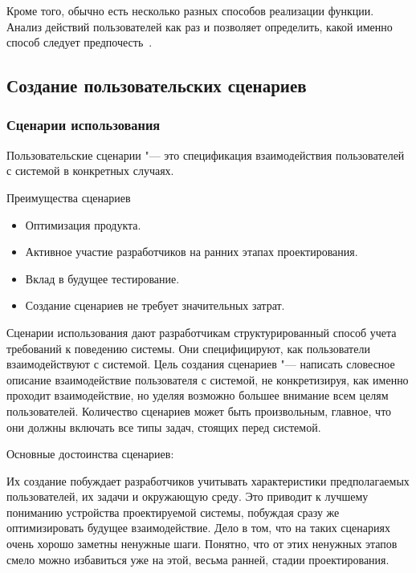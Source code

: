 \documentclass{../industrial-development}
\begin{document}
Кроме того, обычно есть несколько разных способов реализации функции. Анализ действий пользователей как раз и позволяет определить, какой именно способ следует предпочесть~\cite[с.~113--114]{Golovach}.

\subsection{Создание пользовательских сценариев}

\begin{frame} \frametitle{Сценарии использования}
  \begin{definition}
    \alert{Пользовательские сценарии} "--- это спецификация взаимодействия пользователей с системой в конкретных случаях.
  \end{definition}
  
  \begin{block}{Преимущества сценариев}
   \begin{itemize}
    \item Оптимизация продукта.
    \item Активное участие разработчиков на ранних этапах проектирования.
    \item Вклад в будущее тестирование.
    \item Создание сценариев не требует значительных затрат.
  \end{itemize}
  \end{block}
\end{frame}

\lecturenotes

Сценарии использования дают разработчикам структурированный способ учета требований к поведению системы. Они специфицируют, как пользователи взаимодействуют с системой. Цель создания сценариев "--- написать словесное описание взаимодействие пользователя с системой, не конкретизируя, как именно проходит взаимодействие, но уделяя возможно большее внимание всем целям пользователей. Количество сценариев может быть произвольным, главное, что они должны включать все типы задач, стоящих перед системой.

Основные достоинства сценариев:

Их создание побуждает разработчиков учитывать характеристики предполагаемых пользователей, их задачи и окружающую среду. Это приводит к лучшему пониманию устройства проектируемой системы, побуждая сразу же оптимизировать будущее взаимодействие. Дело в том, что на таких сценариях очень хорошо заметны ненужные шаги. Понятно, что от этих ненужных этапов смело можно избавиться уже на этой, весьма ранней, стадии проектирования.
\end{document}

